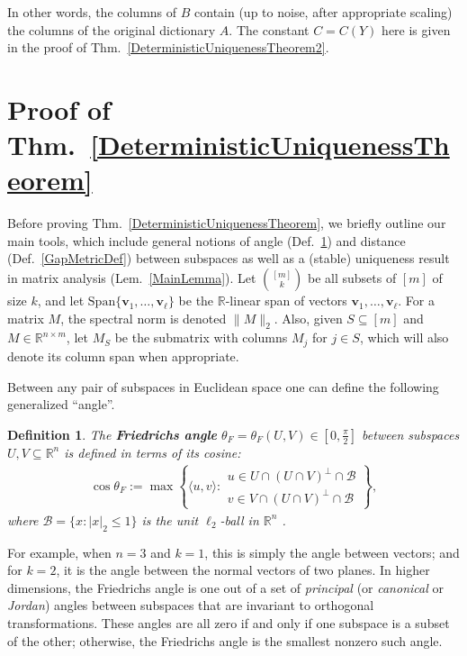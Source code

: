 \documentclass[journal, twocolumn]{IEEEtran}
\newtheorem{definition}{Definition}
\begin{document}
In other words, the columns of $B$ contain (up to noise, after appropriate scaling) the columns of the original dictionary $A$. 
The constant \mbox{$C = C(Y)$} here is given in the proof of Thm.~\ref{DeterministicUniquenessTheorem2}. 



\section{Proof of Thm.~\ref{DeterministicUniquenessTheorem}}\label{DUT}
Before proving Thm.~\ref{DeterministicUniquenessTheorem}, we briefly outline our main tools, which include general notions of angle (Def.~\ref{FriedrichsDefinition}) and distance (Def.~\ref{GapMetricDef}) between subspaces as well as a (stable) uniqueness result in matrix analysis (Lem.~\ref{MainLemma}).
Let ${[m] \choose k}$ be all subsets of $[m]$ of size $k$, and let $\text{Span}\{\mathbf{v}_1, \ldots, \mathbf{v}_\ell\}$ be the $\mathbb{R}$-linear span of vectors $\mathbf{v}_1, \ldots, \mathbf{v}_\ell$.  For a matrix $M$, the spectral norm is denoted $\|M\|_2$.
Also, given $S \subseteq [m]$ and $M \in \mathbb{R}^{n \times m}$, let $M_S$ be the submatrix with columns $M_j$ for $j \in S$, which will also denote its column span when appropriate.  

Between any pair of subspaces in Euclidean space one can define the following generalized ``angle''.
\begin{definition}\label{FriedrichsDefinition}
The \textbf{Friedrichs angle} $\theta_F = \theta_F(U,V) \in [0,\frac{\pi}{2}]$ between subspaces $U,V \subseteq \mathbb{R}^n$ is defined in terms of its cosine:
\begin{align*}
\cos{\theta_F} := \max\left\{ \langle u, v \rangle: \substack{ u \in U \cap (U \cap V)^\perp \cap \mathcal{B} \\ v \in V \cap (U \cap V)^\perp \cap \mathcal{B} } \right\},
\end{align*}
where $\mathcal{B} = \{ x: |x|_2 \leq 1\}$ is the unit $\ell_2$-ball in $\mathbb{R}^n$ \cite{Deutsch12}.
\end{definition}
For example, when $n=3$ and $k=1$, this is simply the angle between vectors; and for $k=2$, it is the angle between the normal vectors of two planes. In higher dimensions, the Friedrichs angle is one out of a set of \textit{principal} (or \textit{canonical} or \textit{Jordan}) angles between subspaces that are invariant to orthogonal transformations. These angles are all zero if and only if one subspace is a subset of the other; otherwise, the Friedrichs angle is the smallest nonzero such angle. 
\end{document}

